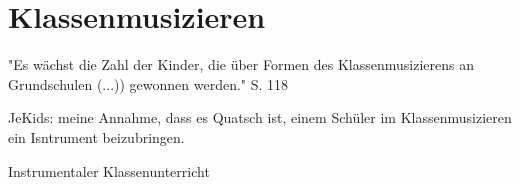 \section{Klassenmusizieren}


"Es wächst die Zahl der Kinder, die über Formen des Klassenmusizierens an
Grundschulen (...)) gewonnen werden." S. 118 

JeKids: meine Annahme, dass es Quatsch ist, einem Schüler im Klassenmusizieren
ein Isntrument beizubringen.

Instrumentaler Klassenunterricht
